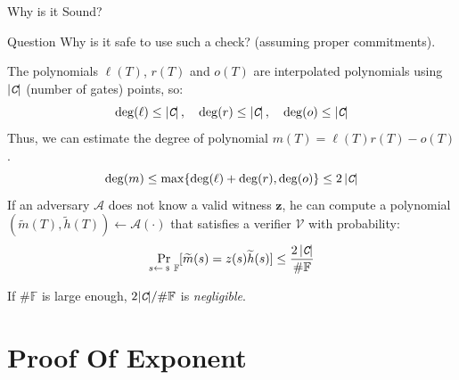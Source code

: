 \documentclass{zkdl-presentation-template}
\providecommand{\Circ}{\textit{\texttt{C}}}
\begin{document}
    \begin{frame}{Why is it Sound?}
        \begin{questionblock}{Question}
            Why is it safe to use such a check? (assuming proper commitments).
        \end{questionblock}
        \pause

        The polynomials $\ell(T)$, $r(T)$ and $o(T)$ are interpolated polynomials using
        $\left| \Circ \right|$ (number of gates) points, so:
        \vspace{-5pt}
        \begin{equation*}
            \deg(\ell) \le \left| \Circ \right|, \quad
            \deg(r) \le \left| \Circ \right|, \quad
            \deg(o) \le \left| \Circ \right|
            \vspace{-5pt}
        \end{equation*}
        \pause
        Thus, we can estimate the degree of polynomial $m(T) = \ell(T)r(T) - o(T)$.
        \vspace{-5pt}
        \begin{equation*}
            \deg(m) \leq \max\{\deg(\ell) + \deg(r), \deg(o)\} \leq 2 \left| \Circ \right|
            \vspace{-5pt}
        \end{equation*}
        \pause
        If an adversary $\mathcal{A}$ does not know a valid witness $\mathbf{z}$, he can compute a
        polynomial $(\widetilde{m}(T), \widetilde{h}(T)) \gets \mathcal{A}(\cdot)$ that satisfies a verifier
        $\mathcal{V}$ with probability:
        \vspace{-5pt}
        \begin{equation*}
            \Pr_{s \leftarrowS \mathbb{F}}[\widetilde{m}(s) = z(s)\widetilde{h}(s)] \leq \frac{2 \left| \Circ \right|}{\#\mathbb{F}}
        \end{equation*}

        If $\#\mathbb{F}$ is large enough, $2|\Circ|/\#\mathbb{F}$ is \textit{negligible}.
    \end{frame}

    \section{Proof Of Exponent}
\end{document}

